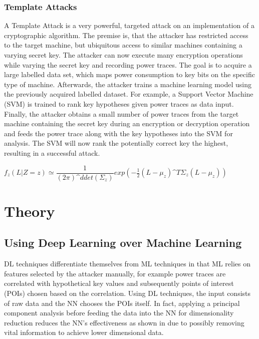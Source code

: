\documentclass[journal]{IEEEtran}
\begin{document}
\subsubsection{Template Attacks}
\label{subsec:template}
A Template Attack is a very powerful, targeted attack on an implementation of a cryptographic algorithm. The premise is, that the attacker has restricted access to the target machine, but ubiquitous access to similar machines containing a varying secret key. The attacker can now execute many encryption operations while varying the secret key and recording power traces. The goal is to acquire a large labelled data set, which maps power consumption to key bits on the specific type of machine. Afterwards, the attacker trains a machine learning model using the previously acquired labelled dataset. For example, a Support Vector Machine (SVM) is trained to rank key hypotheses given power traces as data input. Finally, the attacker obtains a small number of power traces from the target machine containing the secret key during an encryption or decryption operation and feeds the power trace along with the key hypotheses into the SVM for analysis. The SVM will now rank the potentially correct key the highest, resulting in a successful attack.

$ f_z(L|Z=z) \simeq \dfrac{1}{(2\pi)\^{d}det(\Sigma_z)}exp(-\frac{1}{2}(L-\mu_z)\^{T}\Sigma_z(L-\mu_z)) $


\section{Theory}
\subsection{Using Deep Learning over Machine Learning}
DL techniques differentiate themselves from ML techniques in that ML relies on features selected by the attacker manually, for example power traces are correlated with hypothetical key values and subsequently points of interest (POIs) chosen based on the correlation. Using DL techniques, the input consists of raw data and the NN chooses the POIs itself. In fact, applying a principal component analysis before feeding the data into the NN for dimensionality reduction reduces the NN's effectiveness as shown in \cite[p.~15]{breaking-crypto-dl:prouff} due to possibly removing vital information to achieve lower dimensional data.
\end{document}
